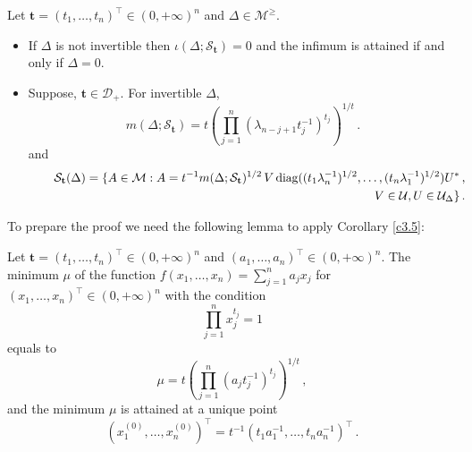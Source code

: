 \documentclass{amsart}
\begin{document}
\begin{pro} \label{p5.1}
Let ${\mathbf t}=(t_1,\ldots,t_n)^\top \in (0,+\infty)^n$ and $\Delta \in {\mathcal M}^\geq$.
\begin{itemize}
\item[(i)] If $\Delta$ is not invertible then $\iota(\Delta ; {\mathcal S}_{\mathbf t}) = 0$ and the infimum is attained if and only if $\Delta=0$. 
\item[(ii)] Suppose, ${\mathbf t} \in {\mathcal D}_+$. For invertible $\Delta$,
\begin{equation} \label{f5.1}
     m(\Delta ; {\mathcal S}_{\mathbf t}) = t \left( \prod_{j=1}^n (\lambda_{n-j+1} t_j^{-1})^{t_j} \right)^{1/t} \, .
\end{equation}
and 
\begin{eqnarray*}
 \quad \quad {\mathcal S}_{\mathbf t}(\Delta) = \{ A \in {\mathcal M} : A=t^{-1}  m(\Delta ; {\mathcal S}_{\mathbf t})^{1/2} \, V \, {\rm diag}((t_1\lambda_n^{-1})^{1/2}, \ldots , (t_n \lambda_1^{-1})^{1/2}) U^* \, , & &\\
V \in {\mathcal U}, U \in {\mathcal U}_\Delta \} \, . &  & 
\end{eqnarray*}
\end{itemize}
\end{pro}

To prepare the proof we need the following lemma to apply Corollary \ref{c3.5}:

\begin{lem} \label{l5.2}
    Let ${\mathbf t}=(t_1,\ldots,t_n)^\top \in (0,+\infty)^n$ and $(a_1,\ldots,a_n)^\top \in (0,+\infty)^n$. The minimum $\mu$ of the function $f(x_1,\ldots,x_n) = \sum_{j=1}^n a_j x_j$ for $(x_1,\ldots,x_n)^\top \in (0,+\infty)^n$ with the condition 
\begin{equation} \label{f5.2}
     \prod_{j=1}^n x_j^{t_j} = 1
\end{equation}
equals to
\begin{equation} \label{f5.3}
     \mu = t \left( \prod_{j=1}^n (a_j t_j^{-1})^{t_j} \right)^{1/t}\, ,
\end{equation}
and the minimum $\mu$ is attained at a unique point 
\begin{equation} \label{f5.4}
     (x_1^{(0)}, \ldots , x_n^{(0)})^\top= t^{-1} (t_1a_1^{-1},\ldots,t_n a_n^{-1})^\top  \, .
\end{equation}
\end{lem}     
\end{document}
